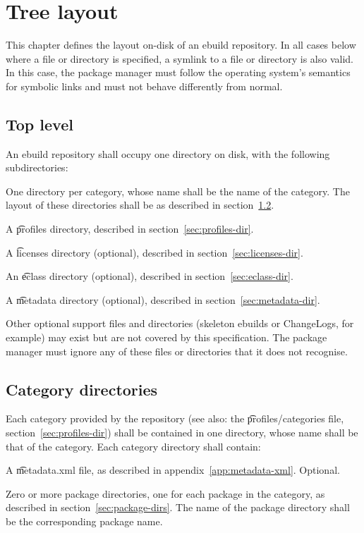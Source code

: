 \chapter{Tree layout}

This chapter defines the layout on-disk of an ebuild repository. In all cases below where a file or
directory is specified, a symlink to a file or directory is also valid. In this case, the package
manager must follow the operating system's semantics for symbolic links and must not behave
differently from normal.

\section{Top level}

An ebuild repository shall occupy one directory on disk, with the following subdirectories:
\nobreakpar
\begin{compactitem}
\item One directory per category, whose name shall be the name of the category. The layout of
    these directories shall be as described in section~\ref{sec:category-dirs}.
\item A \t{profiles} directory, described in section~\ref{sec:profiles-dir}.
\item A \t{licenses} directory (optional), described in section~\ref{sec:licenses-dir}.
\item An \t{eclass} directory (optional), described in section~\ref{sec:eclass-dir}.
\item A \t{metadata} directory (optional), described in section~\ref{sec:metadata-dir}.
\item Other optional support files and directories (skeleton ebuilds or ChangeLogs,
    for example) may exist but are not covered by this specification. The package manager must
    ignore any of these files or directories that it does not recognise.

\end{compactitem}

\section{Category directories}
\label{sec:category-dirs}

Each category provided by the repository (see also: the \t{profiles/categories} file,
section~\ref{sec:profiles-dir}) shall be contained in one directory, whose name shall be that of
the category. Each category directory shall contain:
\begin{compactitem}
\item A \t{metadata.xml} file, as described in appendix~\ref{app:metadata-xml}\@. Optional.
\item Zero or more package directories, one for each package in the category, as described in
    section~\ref{sec:package-dirs}. The name of the package directory shall be the corresponding
    package name.
\end{compactitem}

